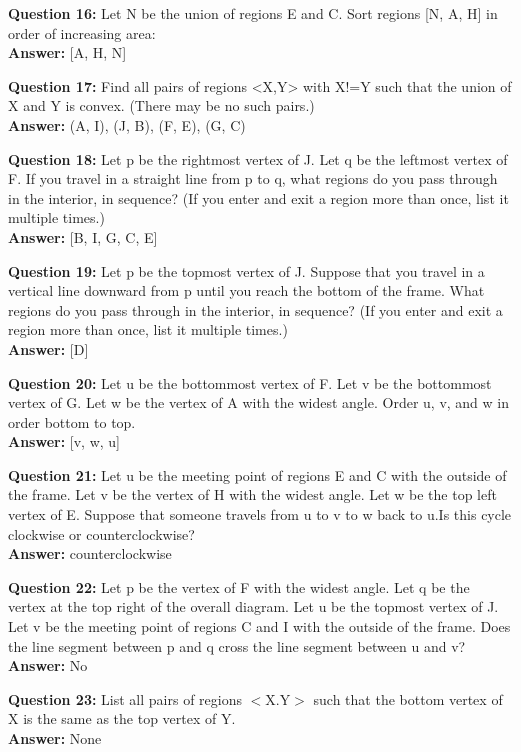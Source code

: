 \documentclass{article}    %
\begin{document}
{\bf Question 16:}
Let N be the union of regions E and C. Sort regions [N, A, H] in order of increasing area: \\
{\bf Answer:}
[A, H, N]

{\bf Question 17:}
Find all pairs of regions <X,Y> with X!=Y such that the union of X and Y is convex. (There may be no such pairs.) \\
{\bf Answer:}
{(A, I), (J, B), (F, E), (G, C)}

{\bf Question 18:}
Let p be the rightmost vertex of J. Let q be the leftmost vertex of F. If you travel in a straight line from p to q, what regions do you pass through in the interior, in sequence? (If you enter and exit a region more than once, list it multiple times.) \\
{\bf Answer:}
[B, I, G, C, E]

{\bf Question 19:}
Let p be the topmost vertex of J. Suppose that you travel in a vertical line downward from p until you reach the bottom of the frame. What regions do you pass through in the interior, in sequence? (If you enter and exit a region more than once, list it multiple times.) \\
{\bf Answer:}
[D]

{\bf Question 20:}
Let u be the bottommost vertex of F. Let v be the bottommost vertex of G. Let w be the vertex of A with the widest angle. Order u, v, and w in order bottom to top. \\
{\bf Answer:}
[v, w, u]

{\bf Question 21:}
Let u be the meeting point of regions E and C with the outside of the frame. Let v be the vertex of H with the widest angle. Let w be the top left vertex of E. Suppose that someone travels from u to v to w back to u.Is this cycle clockwise or counterclockwise? \\
{\bf Answer:}
counterclockwise

{\bf Question 22:}
Let p be the vertex of F with the widest angle. Let q be the vertex at the top right of the overall diagram. Let u be the topmost vertex of J. Let v be the meeting point of regions C and I with the outside of the frame. Does the line segment between p and q cross the line segment between u and v? \\
{\bf Answer:}
No



{\bf Question 23:}
List all pairs of regions $<$X.Y$>$ such that the bottom vertex of X is the same as the top vertex of Y. \\
{\bf Answer:}
None
\end{document}
